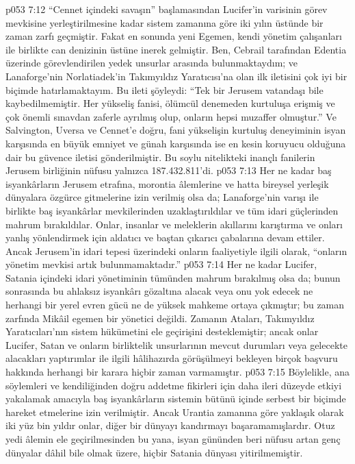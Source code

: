 \vs p053 7:12 “Cennet içindeki savaşın” başlamasından Lucifer’in varisinin görev mevkisine yerleştirilmesine kadar sistem zamanına göre iki yılın üstünde bir zaman zarfı geçmiştir. Fakat en sonunda yeni Egemen, kendi yönetim çalışanları ile birlikte can denizinin üstüne inerek gelmiştir. Ben, Cebrail tarafından Edentia üzerinde görevlendirilen yedek unsurlar arasında bulunmaktaydım; ve Lanaforge’nin Norlatiadek’in Takımyıldız Yaratıcısı’na olan ilk iletisini çok iyi bir biçimde hatırlamaktayım. Bu ileti şöyleydi: “Tek bir Jerusem vatandaşı bile kaybedilmemiştir. Her yükseliş fanisi, ölümcül denemeden kurtuluşa erişmiş ve çok önemli sınavdan zaferle ayrılmış olup, onların hepsi muzaffer olmuştur.” Ve Salvington, Uversa ve Cennet’e doğru, fani yükselişin kurtuluş deneyiminin isyan karşısında en büyük emniyet ve günah karşısında ise en kesin koruyucu olduğuna dair bu güvence iletisi gönderilmiştir. Bu soylu nitelikteki inançlı fanilerin Jerusem birliğinin nüfusu yalnızca 187.432.811’di.
\vs p053 7:13 Her ne kadar baş isyankârların Jerusem etrafına, morontia âlemlerine ve hatta bireysel yerleşik dünyalara özgürce gitmelerine izin verilmiş olsa da; Lanaforge’nin varışı ile birlikte baş isyankârlar mevkilerinden uzaklaştırıldılar ve tüm idari güçlerinden mahrum bırakıldılar. Onlar, insanlar ve meleklerin akıllarını karıştırma ve onları yanlış yönlendirmek için aldatıcı ve baştan çıkarıcı çabalarına devam ettiler. Ancak Jerusem’in idari tepesi üzerindeki onların faaliyetiyle ilgili olarak, “onların yönetim mevkisi artık bulunmamaktadır.”
\vs p053 7:14 Her ne kadar Lucifer, Satania içindeki idari yönetiminin tümünden mahrum bırakılmış olsa da; bunun sonrasında bu ahlaksız isyankârı gözaltına alacak veya onu yok edecek ne herhangi bir yerel evren gücü ne de yüksek mahkeme ortaya çıkmıştır; bu zaman zarfında Mikâil egemen bir yönetici değildi. Zamanın Ataları, Takımyıldız Yaratıcıları’nın sistem hükümetini ele geçirişini desteklemiştir; ancak onlar Lucifer, Satan ve onların birliktelik unsurlarının mevcut durumları veya gelecekte alacakları yaptırımlar ile ilgili hâlihazırda görüşülmeyi bekleyen birçok başvuru hakkında herhangi bir karara hiçbir zaman varmamıştır.
\vs p053 7:15 Böylelikle, ana söylemleri ve kendiliğinden doğru addetme fikirleri için daha ileri düzeyde etkiyi yakalamak amacıyla baş isyankârların sistemin bütünü içinde serbest bir biçimde hareket etmelerine izin verilmiştir. Ancak Urantia zamanına göre yaklaşık olarak iki yüz bin yıldır onlar, diğer bir dünyayı kandırmayı başaramamışlardır. Otuz yedi âlemin ele geçirilmesinden bu yana, isyan gününden beri nüfusu artan genç dünyalar dâhil bile olmak üzere, hiçbir Satania dünyası yitirilmemiştir.
